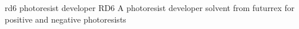 \newglsXchemical%
{rd6}%
{photoresist developer}%
{RD6}%
{A photoresist developer solvent from \gls{futurrex} for positive and negative photoresists}%